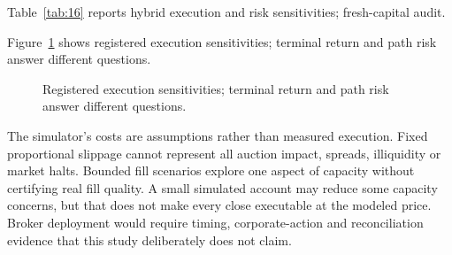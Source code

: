 \noindent Table~\ref{tab:16} reports hybrid execution and risk sensitivities; fresh-capital audit.



\noindent Figure~\ref{fig:12} shows registered execution sensitivities; terminal return and path risk answer different questions.

\begin{figure}[htbp]\centering

\caption{Registered execution sensitivities; terminal return and path risk answer different questions.}\label{fig:12}
\end{figure}

The simulator's costs are assumptions rather than measured execution. Fixed proportional slippage cannot represent all auction impact, spreads, illiquidity or market halts. Bounded fill scenarios explore one aspect of capacity without certifying real fill quality. A small simulated account may reduce some capacity concerns, but that does not make every close executable at the modeled price. Broker deployment would require timing, corporate-action and reconciliation evidence that this study deliberately does not claim.
